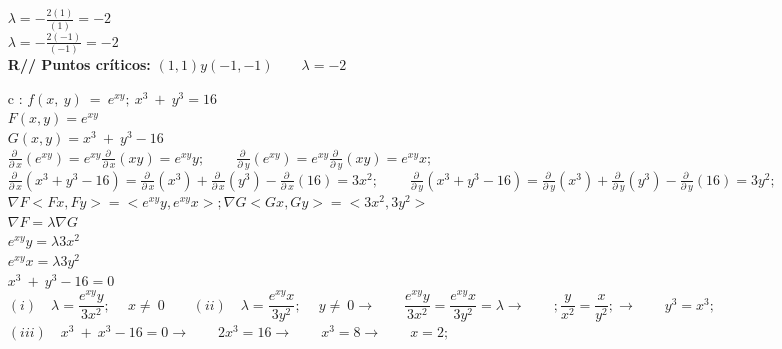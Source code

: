\documentclass[13pt]{memoir}
\begin{document}
\begin{enumerate}
$\lambda = -\frac{2\left(1\right)}{\left(1\right)} = -2$\\
$\lambda = -\frac{2\left(-1\right)}{\left(-1\right)} = -2$\\

\textbf{R// Puntos críticos: }
$\left(1,1 \right) y \left(-1,-1 \right) \qquad  \lambda = -2$\\

\item[ c]: $f\left(x,\:y\right)\:=\:e^{xy};\:x^3\:+\:y^3=16 $ \\

$F(x, y) = e^{xy}$ \\
$G(x, y) = x^3\:+\:y^3 - 16$ \\

$\frac{\partial \:}{\partial \:x}\left(e^{xy}\right) =e^{xy}\frac{\partial \:}{\partial \:x}\left(xy\right) = e^{xy}y ;\: \qquad \frac{\partial \:}{\partial \:y}\left(e^{xy}\right) = e^{xy}\frac{\partial \:}{\partial \:y}\left(xy\right) = e^{xy}x ;\:$\\

$ \frac{\partial \:}{\partial \:x}\left(x^3+y^3-16\right) = \frac{\partial \:}{\partial \:x}\left(x^3\right)+\frac{\partial \:}{\partial \:x}\left(y^3\right)-\frac{\partial \:}{\partial \:x}\left(16\right) = 3x^2 ;\: \qquad \frac{\partial \:}{\partial \:y}\left(x^3+y^3-16\right) =\frac{\partial \:}{\partial \:y}\left(x^3\right)+\frac{\partial \:}{\partial \:y}\left(y^3\right)-\frac{\partial \:}{\partial \:y}\left(16\right) = 3y^2 ;\:$\\


$\nabla F <Fx, Fy> = <e^{xy}y,e^{xy}x>; \nabla G <Gx, Gy> = <3x^2,3y^2>$ \\
$\nabla F = \lambda \nabla G$ \\

$e^{xy}y = \lambda 3x^2$\\
$e^{xy}x = \lambda 3y^2$\\
$x^3\:+\:y^3 - 16 = 0$\\

$\left(i\right)\quad \lambda = \dfrac{e^{xy}y}{3x^2} ;\quad \:x\ne \:0 \qquad (ii)\quad \lambda = \dfrac{e^{xy}x}{3y^2} ;\quad \:y\ne \:0 \rightarrow \qquad \dfrac{e^{xy}y}{3x^2} = \dfrac{e^{xy}x}{3y^2} = \lambda \rightarrow\qquad; \dfrac{y}{x^2} = \dfrac{x}{y^2}; \rightarrow\qquad y^3 = x^3;$\\

$\left(iii\right)\quad x^3\:+\:x^3 - 16 = 0 \rightarrow\qquad 2x^3 = 16 \rightarrow\qquad x^3 = 8 \rightarrow\qquad x = 2;$\\


\end{enumerate}
\end{document}
